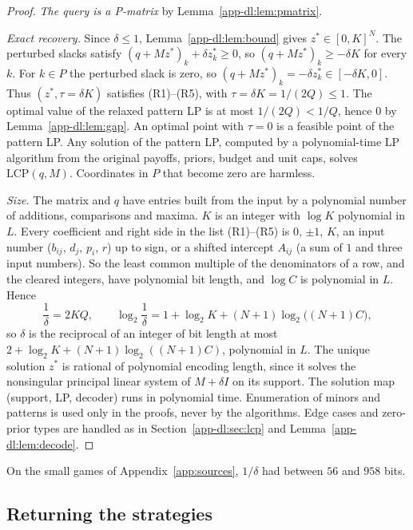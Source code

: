 \begin{proof}
\emph{The query is a P-matrix} by Lemma~\ref{app-dl:lem:pmatrix}.

\emph{Exact recovery.} Since $\delta\le1$, Lemma~\ref{app-dl:lem:bound} gives $z^*\in[0,K]^N$. The
perturbed slacks satisfy $(q+Mz^*)_k+\delta z^*_k\ge0$, so $(q+Mz^*)_k\ge-\delta K$ for every $k$. For
$k\in P$ the perturbed slack is zero, so $(q+Mz^*)_k=-\delta z^*_k\in[-\delta K,0]$. Thus
$(z^*,\tau=\delta K)$ satisfies (R1)--(R5), with $\tau=\delta K=1/(2Q)\le1$. The optimal value of the
relaxed pattern LP is at most $1/(2Q)<1/Q$, hence $0$ by Lemma~\ref{app-dl:lem:gap}. An optimal point
with $\tau=0$ is a feasible point of the pattern LP. Any solution of the pattern LP, computed by a
polynomial-time LP algorithm from the original payoffs, priors, budget and unit caps, solves
$\mathrm{LCP}(q,M)$. Coordinates in $P$ that become zero are harmless.

\emph{Size.} The matrix and $q$ have entries built from the input by a polynomial number of additions,
comparisons and maxima. $K$ is an integer with $\log K$ polynomial in $L$. Every coefficient and right
side in the list (R1)--(R5) is $0$, $\pm1$, $K$, an input number ($b_{ij}$, $d_j$, $p_i$, $r$) up to
sign, or a shifted intercept $A_{ij}$ (a sum of $1$ and three input numbers). So the least common
multiple of the denominators of a row, and the cleared integers, have polynomial bit length, and
$\log C$ is polynomial in $L$. Hence
\[
  \frac1\delta=2KQ,\qquad \log_2\frac1\delta=1+\log_2K+(N+1)\log_2\bigl((N+1)C\bigr),
\]
so $\delta$ is the reciprocal of an integer of bit length at most $2+\log_2K+(N+1)\log_2((N+1)C)$,
polynomial in $L$. The unique solution $z^*$ is rational of polynomial encoding length, since it solves
the nonsingular principal linear system of $M+\delta I$ on its support. The solution map (support, LP,
decoder) runs in polynomial time. Enumeration of minors and patterns is used only in the proofs, never by
the algorithms. Edge cases and zero-prior types are handled as in Section~\ref{app-dl:sec:lcp} and
Lemma~\ref{app-dl:lem:decode}.
\end{proof}

On the small games of Appendix~\ref{app:sources}, $1/\delta$ had between $56$ and $958$ bits.

\subsection{Returning the strategies}\label{app-dl:sec:decode}

